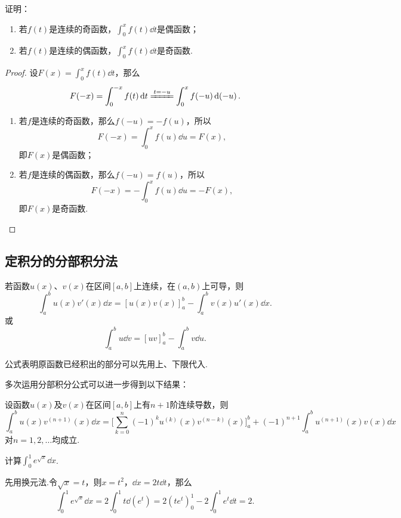 \begin{example}
证明：\begin{enumerate}
\item 若\(f(t)\)是连续的奇函数，\(\int_0^x f(t) \dd{t}\)是偶函数；
\item 若\(f(t)\)是连续的偶函数，\(\int_0^x f(t) \dd{t}\)是奇函数.
\end{enumerate}
\begin{proof}
设\(F(x) = \int_0^x f(t) \dd{t}\)，那么\[
F(-x) = \int_0^{-x} f(t) \dd{t}
\xlongequal{t=-u} \int_0^x f(-u) \dd(-u).
\]
\begin{enumerate}
\item 若\(f\)是连续的奇函数，那么\(f(-u) = -f(u)\)，所以\[
F(-x) = \int_0^x f(u) \dd{u} = F(x),
\]即\(F(x)\)是偶函数；

\item 若\(f\)是连续的偶函数，那么\(f(-u) = f(u)\)，所以\[
F(-x) = -\int_0^x f(u) \dd{u} = -F(x),
\]即\(F(x)\)是奇函数.
\qedhere
\end{enumerate}
\end{proof}
\end{example}

\subsection{定积分的分部积分法}
\begin{theorem}
若函数\(u(x)\)、\(v(x)\)在区间\([a,b]\)上连续，在\((a,b)\)上可导，则\[
\int_a^b u(x) v'(x) \dd{x} = [u(x) v(x)]_a^b - \int_a^b v(x) u'(x) \dd{x}.
\]或\[
\int_a^b u \dd{v} = [uv]_a^b - \int_a^b v \dd{u}.
\]
\end{theorem}
公式表明原函数已经积出的部分可以先用上、下限代入.

多次运用分部积分公式可以进一步得到以下结果：
\begin{corollary}
设函数\(u(x)\)及\(v(x)\)在区间\([a,b]\)上有\(n+1\)阶连续导数，则\[
\int_a^b u(x) v^{(n+1)}(x) \dd{x}
= \biggl[
\sum_{k=0}^n (-1)^k u^{(k)}(x) v^{(n-k)}(x)
\biggr]_a^b + (-1)^{n+1} \int_a^b u^{(n+1)}(x) v(x) \dd{x}
\]对\(n=1,2,\dotsc\)均成立.
\end{corollary}

\begin{example}
计算\(\int_0^1 e^{\sqrt{x}} \dd{x}\).
\begin{solution}
先用换元法.令\(\sqrt{x}=t\)，则\(x=t^2\)，\(\dd{x} = 2t\dd{t}\)，那么\[
\int_0^1 e^{\sqrt{x}} \dd{x}
= 2 \int_0^1 t \dd(e^t)
= 2 (t e^t)_0^1 - 2 \int_0^1 e^t \dd{t}
= 2.
\]
\end{solution}
\end{example}

